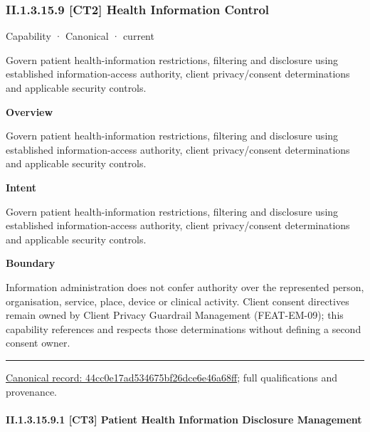 \subsubsection*{II.1.3.15.9 [CT2] Health Information Control}
\label{navigation:II.1.3.15.9}

\label{element:44cc0e17ad534675bf26dce6e46a68ff}
{\small Capability · Canonical · current}\par

Govern patient health-information restrictions, filtering and disclosure using established information-access authority, client privacy/consent determinations and applicable security controls.



\textbf{Overview}



Govern patient health-information restrictions, filtering and disclosure using established information-access authority, client privacy/consent determinations and applicable security controls.



\textbf{Intent}



Govern patient health-information restrictions, filtering and disclosure using established information-access authority, client privacy/consent determinations and applicable security controls.



\textbf{Boundary}



Information administration does not confer authority over the represented person, organisation, service, place, device or clinical activity. Client consent directives remain owned by Client Privacy Guardrail Management (FEAT-EM-09); this capability references and respects those determinations without defining a second consent owner.



\medskip\hrule\medskip

{\footnotesize \href{../../../../continuum/strategy/capability/44cc0e17ad534675bf26dce6e46a68ff.md}{Canonical record: 44cc0e17ad534675bf26dce6e46a68ff}; full qualifications and provenance.}\par
\paragraph*{II.1.3.15.9.1 [CT3] Patient Health Information Disclosure Management}
\label{navigation:II.1.3.15.9.1}

